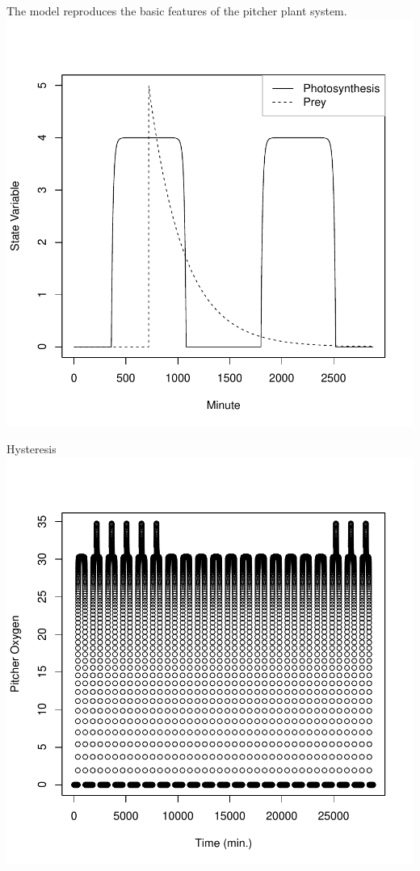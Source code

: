 \documentclass[a0,landscape]{a0poster}
\begin{document}
\begin{multicols}{4}
\begin{block}{The model reproduces the basic features of the pitcher plant system.}
\includegraphics{conference_poster_5-base}

\end{block}


\begin{block}{Hysteresis}
\includegraphics{conference_poster_5-hyst}
  

\end{block}
\end{multicols}
\end{document}

